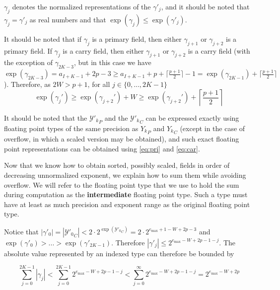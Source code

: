     $\gamma_j$ denotes the normalized representations of the $\gamma'_j$, and it should be noted that $\gamma_j = \gamma'_j$ as real numbers and that $\exp(\gamma_j) \leq \exp(\gamma'_j)$.

    It should be noted that if $\gamma_j$ is a primary field, then either $\gamma_{j + 1}$ or $\gamma_{j + 2}$ is a primary field. If $\gamma_j$ is a carry field, then either $\gamma_{j + 1}$ or $\gamma_{j + 2}$ is a carry field (with the exception of $\gamma_{2  K - 3}$, but in this case we have $\exp(\gamma_{2  K - 3}) = a_{I + K - 1} + 2  p - 3 \geq a_{I + K - 1} + p + \lceil\frac{p + 1}{2}\rceil - 1 = \exp(\gamma_{2  K - 1}) + \lceil\frac{p + 1}{2}\rceil$). Therefore, as $2  W > p + 1$, for all $j \in \{0, ..., 2  K - 1\}$
    \begin{equation}
      \exp(\gamma_j') \geq \exp(\gamma_{j + 2}') + W \geq \exp(\gamma_{j + 2}') + \left\lceil\frac{p + 1}{2}\right\rceil
      \label{eq:gammadecreasesfast}
    \end{equation}

    It should be noted that the ${\mathcal{Y}'_k}_P$ and the ${\mathcal{Y}'_k}_C$ can be expressed exactly using floating point types of the same precision as ${Y_k}_P$ and ${Y_k}_C$ (except in the case of overflow, in which a scaled version may be obtained), and such exact floating point representations can be obtained using  \eqref{eq:pri} and  \eqref{eq:car}.

    Now that we know how to obtain sorted, possibly scaled, fields in order of decreasing unnormalized exponent, we explain how to sum them while avoiding overflow. We will refer to the floating point type that we use to hold the sum during computation as the \textbf{intermediate} floating point type. Such a type must have at least as much precision and exponent range as the original floating point type.

    Notice that $|\gamma'_0| = |{\mathcal{Y}'_0}_C| < 2 \cdot 2^{\exp({\mathcal{Y}'_0}_C)} = 2 \cdot 2^{e_{\max} + 1 - W + 2  p - 3}$ and $\exp(\gamma'_0) > ... > \exp(\gamma'_{2  K - 1})$.  Therefore $|\gamma'_j| \leq 2^{e_{\max} - W + 2  p - 1 - j}$. The absolute value represented by an indexed type can therefore be bounded by

    \begin{equation}
      \label{eq:maxindexedvalue}
      \sum\limits_{j = 0}^{2  K - 1} |\gamma_j| < \sum\limits_{j = 0}^{2  K - 1} 2^{e_{\max} - W + 2  p - 1 - j} < \sum\limits_{j = 0}^{\infty} 2^{e_{\max} - W + 2  p - 1 - j} = 2^{e_{\max} - W + 2  p}
    \end{equation}

